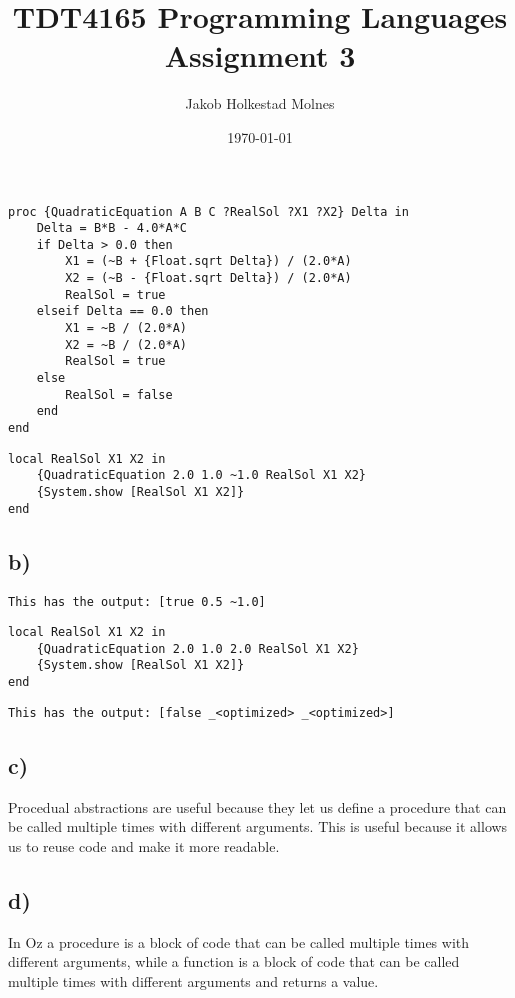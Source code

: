 \documentclass[11pt,a4paper]{report}
\title{TDT4165 Programming Languages Assignment 3}
\author{Jakob Holkestad Molnes}
\date{\today}
\begin{document}
\maketitle

\section{}

\begin{lstlisting}[language=Oz]
proc {QuadraticEquation A B C ?RealSol ?X1 ?X2} Delta in
    Delta = B*B - 4.0*A*C
    if Delta > 0.0 then
        X1 = (~B + {Float.sqrt Delta}) / (2.0*A)
        X2 = (~B - {Float.sqrt Delta}) / (2.0*A)
        RealSol = true
    elseif Delta == 0.0 then
        X1 = ~B / (2.0*A)
        X2 = ~B / (2.0*A)
        RealSol = true
    else
        RealSol = false
    end
end
\end{lstlisting}

\begin{lstlisting}[language=Oz]
local RealSol X1 X2 in
    {QuadraticEquation 2.0 1.0 ~1.0 RealSol X1 X2}
    {System.show [RealSol X1 X2]}
end
\end{lstlisting}
\subsection{b)}
\begin{verbatim}
This has the output: [true 0.5 ~1.0]
\end{verbatim}
\begin{lstlisting}[language=Oz]
local RealSol X1 X2 in
    {QuadraticEquation 2.0 1.0 2.0 RealSol X1 X2}
    {System.show [RealSol X1 X2]}
end
\end{lstlisting}
\begin{verbatim}
This has the output: [false _<optimized> _<optimized>]
\end{verbatim}
\subsection{c)}
Procedual abstractions are useful because they let us define a procedure that can be called multiple times with different arguments. This is useful because it allows us to reuse code and make it more readable.

\subsection{d)}
In Oz a procedure is a block of code that can be called multiple times with different arguments, while a function is a block of code that can be called multiple times with different arguments and returns a value.
\end{document}
